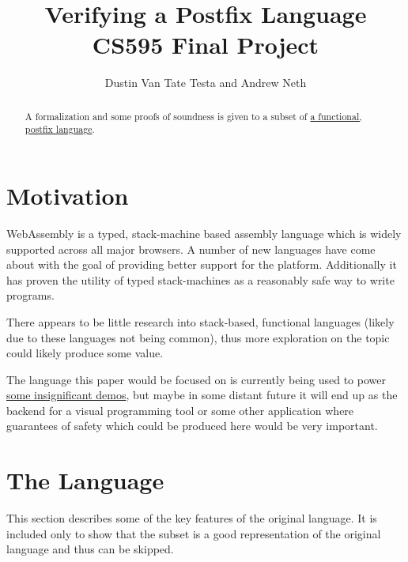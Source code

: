 \documentclass{article}
\title{Verifying a Postfix Language \\
    \large CS595 Final Project}
\author{Dustin Van Tate Testa and Andrew Neth}
\begin{document}
\maketitle
\begin{abstract}
A formalization and some proofs of soundness is given to a subset of \href{https://github.com/dvtate/postfix-haskell}{a functional, postfix language}.
\end{abstract}

\section{Motivation}
WebAssembly is a typed, stack-machine based assembly language which is widely supported across all major browsers. A number of new languages have come about with the goal of providing better support for the platform. Additionally it has proven the utility of typed stack-machines as a reasonably safe way to write programs.

There appears to be little research into stack-based, functional languages (likely due to these languages not being common), thus more exploration on the topic could likely produce some value.

The language this paper would be focused on is currently being used to power \href{https://ridder.xyz/game}{some insignificant demos}, but maybe in some distant future it will end up as the backend for a visual programming tool or some other application where guarantees of safety which could be produced here would be very important.

\section{The Language}
This section describes some of the key features of the original language. It is included only to show that the subset is a good representation of the original language and thus can be skipped.
\end{document}
